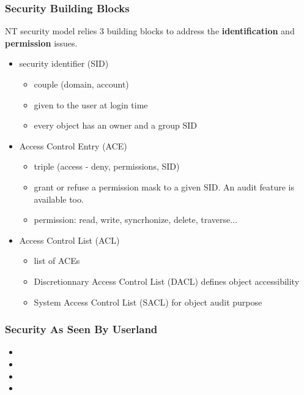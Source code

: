 
\begin{frame}
  \frametitle{Security Building Blocks}

  NT security model relies 3 building blocks to address the
  \textbf{identification} and \textbf{permission} issues.

  \begin{itemize}

    \item
      security identifier (SID)
      \begin{itemize}
      \item
        couple (domain, account)
      \item
        given to the user at login time
      \item
        every object has an owner and a group SID
      \end{itemize}

    \item
      Access Control Entry (ACE)
      \begin{itemize}
        \item
          triple (access - deny, permissions, SID)
        \item
          grant or refuse a permission mask to a given SID. An audit feature is available too.
        \item
          permission: read, write, syncrhonize, delete, traverse...
      \end{itemize}

    \item
      Access Control List (ACL)
      \begin{itemize}
        \item
          list of ACEs
        \item
          Discretionnary Access Control List (DACL) defines object accessibility
        \item
          System Access Control List (SACL) for object audit purpose
      \end{itemize}

  \end{itemize}

\end{frame}


\begin{frame}[containsverbatim]
  \frametitle{Security As Seen By Userland}

  \begin{itemize}
    \item
    \item
    \item
    \item
  \end{itemize}

\end{frame}

